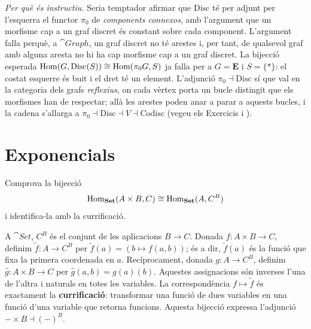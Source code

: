 \begin{solucio}
\emph{Per què és instructiu.} Seria temptador afirmar que $\mathrm{Disc}$ té per adjunt per l'esquerra el functor $\pi_0$ de \emph{components connexos}, amb l'argument que un morfisme cap a un graf discret és constant sobre cada component. L'argument falla perquè, a $\cat{Graph}$, un graf discret no té arestes i, per tant, de qualsevol graf amb alguna aresta no hi ha cap morfisme cap a un graf discret. La bijecció esperada $\operatorname{Hom}(G,\mathrm{Disc}(S))\cong\operatorname{Hom}(\pi_0G,S)$ ja falla per a $G=\mathbf E$ i $S=\{\ast\}$: el costat esquerre és buit i el dret té un element. L'adjunció $\pi_0\dashv\mathrm{Disc}$ sí que val en la categoria dels grafs \emph{reflexius}, on cada vèrtex porta un bucle distingit que els morfismes han de respectar; allà les arestes poden anar a parar a aquests bucles, i la cadena s'allarga a $\pi_0\dashv\mathrm{Disc}\dashv V\dashv\mathrm{Codisc}$ (vegeu els Exercicis i \cite[apèndix~II]{lawvereschanuel}).
\end{solucio}

\section{Exponencials}

\begin{exercici}
Comprova la bijecció
\[
\operatorname{Hom}_{\mathbf{Set}}(A\times B,C)\cong\operatorname{Hom}_{\mathbf{Set}}(A,C^B)
\]
i identifica-la amb la currificació.
\end{exercici}

\begin{solucio}
A $\cat{Set}$, $C^B$ és el conjunt de les aplicacions $B\to C$. Donada $f\colon A\times B\to C$, definim $\tilde f\colon A\to C^B$ per $\tilde f(a)=(b\mapsto f(a,b))$; és a dir, $\tilde f(a)$ és la funció que fixa la primera coordenada en $a$. Recíprocament, donada $g\colon A\to C^B$, definim $\hat g\colon A\times B\to C$ per $\hat g(a,b)=g(a)(b)$. Aquestes assignacions són inverses l'una de l'altra i naturals en totes les variables. La correspondència $f\mapsto\tilde f$ és exactament la \textbf{currificació}: transformar una funció de dues variables en una funció d'una variable que retorna funcions. Aquesta bijecció expressa l'adjunció $-\times B\dashv(-)^B$.
\end{solucio}
